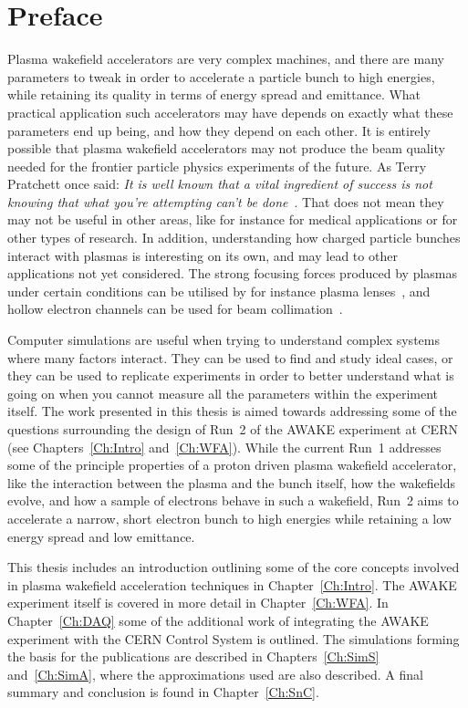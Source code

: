 %
%

\chapter*{Preface}

Plasma wakefield accelerators are very complex machines, and there are many parameters to tweak in order to accelerate a particle bunch to high energies, while retaining its quality in terms of energy spread and emittance.
What practical application such accelerators may have depends on exactly what these parameters end up being, and how they depend on each other.
It is entirely possible that plasma wakefield accelerators may not produce the beam quality needed for the frontier particle physics experiments of the future.
As Terry Pratchett once said: \textit{It is well known that a vital ingredient of success is not knowing that what you're attempting can't be done}~\cite{pratchett:1987}.
That does not mean they may not be useful in other areas, like for instance for medical applications or for other types of research.
In addition, understanding how charged particle bunches interact with plasmas is interesting on its own, and may lead to other applications not yet considered.
The strong focusing forces produced by plasmas under certain conditions can be utilised by for instance plasma lenses~\cite{su:1990}, and hollow electron channels can be used for beam collimation~\cite{stancari:2014}.

Computer simulations are useful when trying to understand complex systems where many factors interact.
They can be used to find and study ideal cases, or they can be used to replicate experiments in order to better understand what is going on when you cannot measure all the parameters within the experiment itself.
The work presented in this thesis is aimed towards addressing some of the questions surrounding the design of Run~2 of the AWAKE experiment at CERN (see Chapters~\ref{Ch:Intro} and~\ref{Ch:WFA}).
While the current Run~1 addresses some of the principle properties of a proton driven plasma wakefield accelerator, like the interaction between the plasma and the bunch itself, how the wakefields evolve, and how a sample of electrons behave in such a wakefield, Run~2 aims to accelerate a narrow, short electron bunch to high energies while retaining a low energy spread and low emittance.

This thesis includes an introduction outlining some of the core concepts involved in plasma wakefield acceleration techniques in Chapter~\ref{Ch:Intro}.
The AWAKE experiment itself is covered in more detail in Chapter~\ref{Ch:WFA}.
In Chapter~\ref{Ch:DAQ} some of the additional work of integrating the AWAKE experiment with the CERN Control System is outlined.
The simulations forming the basis for the publications are described in Chapters~\ref{Ch:SimS} and~\ref{Ch:SimA}, where the approximations used are also described.
A final summary and conclusion is found in Chapter~\ref{Ch:SnC}.

